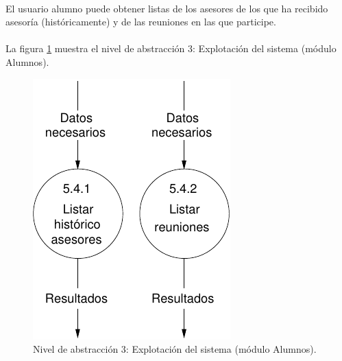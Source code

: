 \paragraph{}El usuario alumno puede obtener listas de los asesores de los que
ha recibido asesoría (históricamente) y de las reuniones en las que participe.

\paragraph{}La figura \ref{diagramaNivel3-ExplotacionSistema-alumnos}
muestra el nivel de abstracción 3: Explotación del sistema (módulo Alumnos).

  \begin{figure}[!ht]
    \begin{center}
      \includegraphics[]{08.Analisis_Funcional/8.2.DFDs/Niveles/Nivel3/Alumnos/ExplotacionSistema/Diagramas/nivel3-ExplotacionSistema.pdf}
      \caption{Nivel de abstracción 3: Explotación del sistema (módulo Alumnos).}
      \label{diagramaNivel3-ExplotacionSistema-alumnos}
    \end{center}
  \end{figure}

